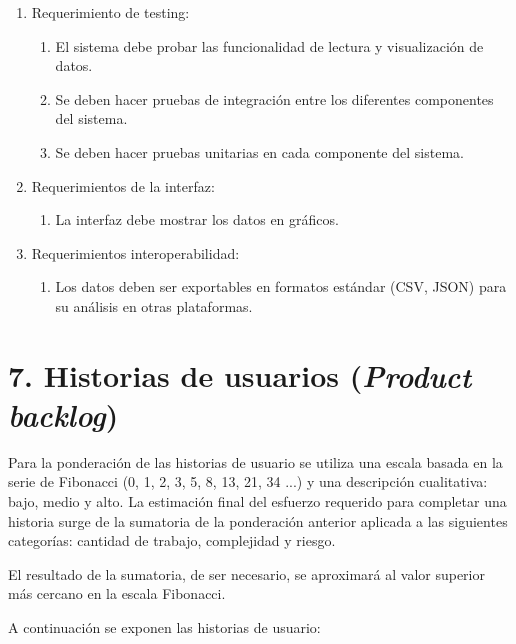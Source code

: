 \documentclass[
11pt, %
codirector, %
]{charter}
\begin{document}
\begin{enumerate}
\begin{enumerate}
		\end{enumerate}
	\item Requerimiento de testing:
		\begin{enumerate}
			\item El sistema debe probar las funcionalidad de lectura y visualización de datos.
			\item Se deben hacer pruebas de integración entre los diferentes componentes del sistema. 
			\item Se deben hacer pruebas unitarias en cada componente del sistema.
		\end{enumerate}
	\item Requerimientos de la interfaz:
		\begin{enumerate}
			\item La interfaz debe mostrar los datos en gráficos.
		\end{enumerate}
	\item Requerimientos interoperabilidad:
		\begin{enumerate}
			\item Los datos deben ser exportables en formatos estándar (CSV, JSON) para su análisis en otras plataformas.
		\end{enumerate}
\end{enumerate}

\section{7. Historias de usuarios (\textit{Product backlog})}
\label{sec:backlog}

Para la ponderación de las historias de usuario se utiliza una escala basada en la serie de
Fibonacci (0, 1, 2, 3, 5, 8, 13, 21, 34 ...) y una descripción cualitativa: bajo, medio y alto.
La estimación final del esfuerzo requerido para completar una historia surge de la sumatoria de
la ponderación anterior aplicada a las siguientes categorías: cantidad de trabajo, complejidad
y riesgo. 

El resultado de la sumatoria, de ser necesario, se aproximará al valor superior más
cercano en la escala Fibonacci.

A continuación se exponen las historias de usuario:
\end{document}
